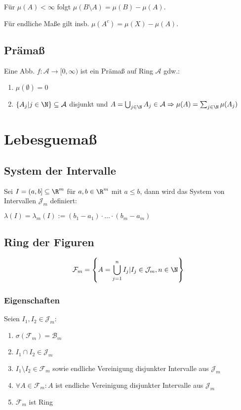 Für $\mu(A) < \infty$ folgt $\mu(B\setminus A) = \mu(B) - \mu(A)$.

Für endliche Maße gilt insb. $\mu(A^c) = \mu(X) - \mu(A)$.

\subsection*{Prämaß}

Eine Abb. $f : \mathcal{A} \rightarrow [0, \infty)$ ist ein Prämaß auf Ring $\mathcal{A}$ gdw.:

\begin{enumerate}[label=(\alph*)]
	\item $\mu(\emptyset) = 0$
	\item $\{A_j | j \in \N\} \subseteq \mathcal{A}$ disjunkt und $A = \bigcup_{j\in \N} A_j \in \mathcal{A} \Rightarrow \mu(A) = \sum_{j\in \N} \mu(A_j)$
\end{enumerate}

\section*{Lebesguemaß}

\subsection*{System der Intervalle}

Sei $I = (a, b] \subseteq \R^m$ für $a, b \in \R^m$ mit $a \leq b$, dann wird das System von Intervallen $\mathcal{J}_m$ definiert:

$\lambda(I) = \lambda_m(I) := (b_1 - a_1) \cdot \hdots \cdot (b_m - a_m)$

\subsection*{Ring der Figuren}

$$\mathcal{F}_m = \left\{ A = \bigcup_{j=1}^n I_j | I_j \in \mathcal{J}_m, n \in \N \right\}$$

\subsubsection*{Eigenschaften}

Seien $I_1, I_2 \in \mathcal{J}_m$:

\begin{enumerate}[label=(\alph*)]
	\item $\sigma(\mathcal{F}_m) = \mathcal{B}_m$
	\item $I_1 \cap I_2 \in \mathcal{J}_m$
	\item $I_1 \setminus I_2 \in \mathcal{F}_m$ sowie endliche Vereinigung disjunkter Intervalle aus $\mathcal{J}_m$
	\item $\forall A \in \mathcal{F}_m: A$ ist endliche Vereinigung disjunkter Intervalle aus $\mathcal{J}_m$
	\item $\mathcal{F}_m$ ist Ring
\end{enumerate}

